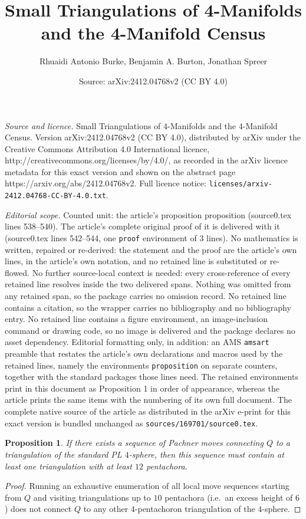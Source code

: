 \documentclass[10pt,a4paper]{amsart}
\title{Small Triangulations of 4-Manifolds and the 4-Manifold Census}
\author{Rhuaidi Antonio Burke, Benjamin A. Burton, Jonathan Spreer}
\date{Source: arXiv:2412.04768v2 (CC BY 4.0)}
\newtheorem{proposition}{Proposition}
\begin{document}
\maketitle

\noindent\emph{Source and licence.} Small Triangulations of 4-Manifolds and the 4-Manifold Census. Version arXiv:2412.04768v2 (CC BY 4.0), distributed by arXiv under the Creative Commons Attribution 4.0 International licence, http://creativecommons.org/licenses/by/4.0/, as recorded in the arXiv licence metadata for this exact version and shown on the abstract page https://arxiv.org/abs/2412.04768v2. Full licence notice: \texttt{licenses/arxiv-2412.04768-CC-BY-4.0.txt}.\par\smallskip

\noindent\textit{Editorial scope.} Counted unit: the article's proposition proposition (source0.tex lines 538--540). The article's complete original proof of it is delivered with it (source0.tex lines 542--544, one \texttt{proof} environment of 3 lines). No mathematics is written, repaired or re-derived: the statement and the proof are the article's own lines, in the article's own notation, and no retained line is substituted or re-flowed.  No further source-local context is needed: every cross-reference of every retained line resolves inside the two delivered spans.  Nothing was omitted from any retained span, so the package carries no omission record.  No retained line contains a citation, so the wrapper carries no bibliography and no bibliography entry.  No retained line contains a figure environment, an image-inclusion command or drawing code, so no image is delivered and the package declares no asset dependency.  Editorial formatting only, in addition: an AMS \texttt{amsart} preamble that restates the article's own declarations and macros used by the retained lines, namely the environments \texttt{proposition} on separate counters, together with the standard packages those lines need.  The retained environments print in this document as Proposition 1 in order of appearance, whereas the article prints the same items with the numbering of its own full document.  The complete native source of the article as distributed in the arXiv e-print for this exact version is bundled unchanged as \texttt{sources/169701/source0.tex}.
\begin{proposition}
    If there exists a sequence of Pachner moves connecting $Q$ to a triangulation of the standard PL $4$-sphere, then this sequence must contain at least one triangulation with at least $12$ pentachora.
\end{proposition}

\begin{proof}
  Running an exhaustive enumeration of all local move sequences starting from $Q$ and visiting triangulations up to $10$ pentachora (i.e.\ an excess height of $6$) does not connect $Q$ to any other $4$-pentachoron triangulation of the $4$-sphere.
\end{proof}
\end{document}
